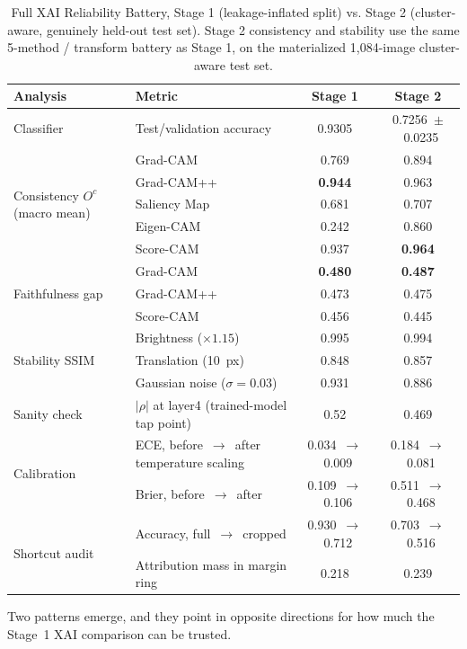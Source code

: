 \begin{table}[!ht]
\centering
\caption{Full XAI Reliability Battery, Stage 1 (leakage-inflated split) vs. Stage 2 (cluster-aware, genuinely held-out test set). Stage 2 consistency and stability use the same 5-method / transform battery as Stage 1, on the materialized 1,084-image cluster-aware test set.}
\label{tbl:stage2-battery}
\begin{tabular}{llcc}
\toprule
Analysis & Metric & Stage 1 & Stage 2 \\
\midrule
Classifier & Test/validation accuracy & 0.9305 & 0.7256~$\pm$~0.0235 \\
\midrule
\multirow{5}{*}{Consistency $O^c$ (macro mean)}
 & Grad-CAM & 0.769 & 0.894 \\
 & Grad-CAM++ & \textbf{0.944} & 0.963 \\
 & Saliency Map & 0.681 & 0.707 \\
 & Eigen-CAM & 0.242 & 0.860 \\
 & Score-CAM & 0.937 & \textbf{0.964} \\
\midrule
\multirow{3}{*}{Faithfulness gap}
 & Grad-CAM & \textbf{0.480} & \textbf{0.487} \\
 & Grad-CAM++ & 0.473 & 0.475 \\
 & Score-CAM & 0.456 & 0.445 \\
\midrule
\multirow{3}{*}{Stability SSIM}
 & Brightness ($\times1.15$) & 0.995 & 0.994 \\
 & Translation (10~px) & 0.848 & 0.857 \\
 & Gaussian noise ($\sigma=0.03$) & 0.931 & 0.886 \\
\midrule
Sanity check & $|\rho|$ at layer4 (trained-model tap point) & 0.52 & 0.469 \\
\midrule
\multirow{2}{*}{Calibration}
 & ECE, before~$\rightarrow$~after temperature scaling & 0.034~$\rightarrow$~0.009 & 0.184~$\rightarrow$~0.081 \\
 & Brier, before~$\rightarrow$~after & 0.109~$\rightarrow$~0.106 & 0.511~$\rightarrow$~0.468 \\
\midrule
\multirow{2}{*}{Shortcut audit}
 & Accuracy, full~$\rightarrow$~cropped & 0.930~$\rightarrow$~0.712 & 0.703~$\rightarrow$~0.516 \\
 & Attribution mass in margin ring & 0.218 & 0.239 \\
\bottomrule
\end{tabular}
\end{table}

Two patterns emerge, and they point in opposite directions for how much the Stage~1 XAI comparison can be trusted.

